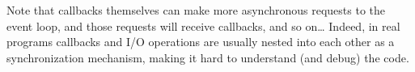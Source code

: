 Note that callbacks themselves can make more asynchronous requests to the event loop, and those requests will receive callbacks, and so on\dots{}
Indeed, in real programs callbacks and I/O operations are usually nested into each other as a synchronization mechanism, making it hard to understand (and debug) the code.

